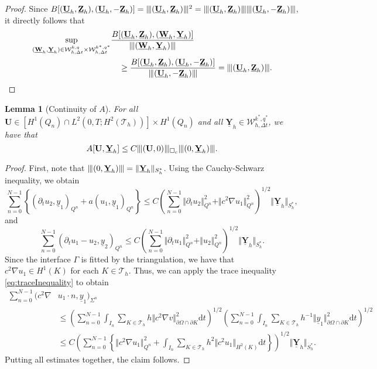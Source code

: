 \documentclass[sn-mathphys-num]{sn-jnl}
\newtheorem{lem}[thm]{Lemma}
\numberwithin{equation}{section}
\newcommand{\wop}{\square_c}
\newcommand{\tnorm}[1]{\vert\hspace{-0.3mm}\Vert#1\Vert\hspace{-0.3mm}\vert}
\newcommand{\dT}{\mathrm{d}t}
\newcommand{\ProdFullyDiscrSpace}[2]{ \mathcal{W}^{ {#1},{#2}}_{h, \Delta t  } }
\newcommand{\Uh}{\underline{\mathbf{U}}_h}
\newcommand{\Yh}{\underline{\mathbf{Y}}_h}
\newcommand{\Zh}{\underline{\mathbf{Z}}_h}
\newcommand{\Wh}{\underline{\mathbf{W}}_h}
\newcommand{\dt}{\partial_t}
\begin{document}
\begin{proof}
    Since $B[(\Uh,\Zh),(\Uh,-\Zh)] = \tnorm{(\Uh,\Zh)}^2 = \tnorm{(\Uh,\Zh)}\tnorm{(\Uh,-\Zh)}$, it directly follows that  
    \begin{align*}
        \sup_{(\Wh,\Yh) \in \ProdFullyDiscrSpace{k}{q} \times \ProdFullyDiscrSpace{k^\ast}{q^\ast}} &\frac{B[(\Uh,\Zh),(\Wh,\Yh)]}{\tnorm{(\Wh,\Yh)}} \\
        &\quad \ge \frac{B[(\Uh,\Zh),(\Uh,-\Zh)]}{\tnorm{(\Uh,-\Zh)}} = \tnorm{(\Uh,\Zh)}.
    \end{align*}
\end{proof}

 
\begin{lem}[Continuity of $A$]\label{lem:continuityA}
    For all $\mathbf{U} \in [H^1(Q_n) \cap L^2(0,T;H^2(\mathcal{T}_h))] \times H^1(Q_n)$ and all $\Yh \in \ProdFullyDiscrSpace{k^\ast}{q^\ast}$, we have that 
    \begin{equation*}
        A[\mathbf{U},\Yh] \le C \tnorm{(\mathbf{U}, 0)}_{\wop} \tnorm{(0,\Yh)}. 
    \end{equation*} 
\end{lem}

\begin{proof}
    First, note that $\tnorm{(0,\Yh)} = \Vert \Yh \Vert_{S_h^\ast}$. Using the Cauchy-Schwarz inequality, we obtain
    \begin{equation*}
        \sum_{n = 0}^{N-1} \left\{ (\dt u_2, \underline{y}_1)_{Q^n} + a(u_1,\underline{y}_1)_{Q^n} \right\} \le C \left( \sum_{n = 0}^{N-1} \Vert \dt u_2 \Vert^2_{Q^n} + \Vert c^2 \nabla u_1 \Vert^2_{Q^n} \right)^{1/2} \! \! \! \Vert \Yh \Vert_{S_h^{\ast}},
    \end{equation*}
    and 
    \begin{equation*}
        \sum_{n = 0}^{N-1} (\dt u_1 - u_2,\underline{y}_2)_{Q^n} \le C \left( \sum_{n = 0}^{N-1} \Vert \dt u_1 \Vert^2_{Q^n} + \Vert u_2 \Vert^2_{Q^n} \right)^{1/2} \Vert \Yh \Vert_{S_h^{\ast}}.
    \end{equation*}
    Since the interface $\Gamma$ is fitted by the triangulation, we have that $c^2 \nabla u_1 \in H^1(K)$ for each $K \in \mathcal{T}_h$. Thus, we can apply the trace inequality \eqref{eq:traceInequality} to obtain
    \begin{align*}
        \sum_{n = 0}^{N-1} (c^2 \nabla &u_1 \cdot n, \underline{y}_1)_{\Sigma^n} \\
        &\le \left( \sum_{n = 0}^{N-1} \int_{I_n} \sum_{K \in \mathcal{T}_h} h \Vert c^2 \nabla v \Vert_{\partial \Omega \cap \partial K}^2 \dT \right)^{1/2} \left( \sum_{n = 0}^{N-1} \int_{I_n} \sum_{K \in \mathcal{T}_h} h^{-1} \Vert \underline{y}_1 \Vert_{\partial \Omega \cap \partial K}^2 \dT \right)^{1/2} \\
        &\le C \left( \sum_{n = 0}^{N-1} \left\{ \Vert c^2 \nabla u_1 \Vert^2_{Q^n} + \int_{I_n} \sum_{K \in \mathcal{T}_h} h^2 \Vert c^2 u_1 \Vert_{H^2(K)} \dT \right\} \right)^{1/2} \Vert \Yh \Vert_{S_h^{\ast}}.
    \end{align*}
    Putting all estimates together, the claim follows. 
\end{proof}
\end{document}
